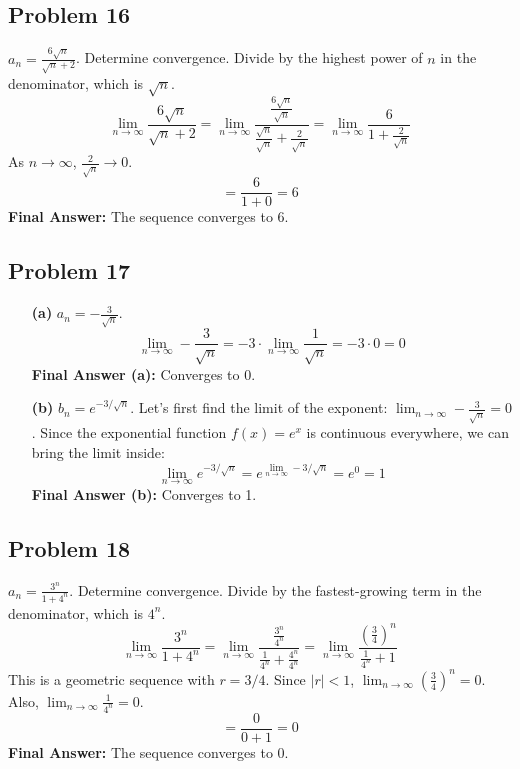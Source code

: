 \documentclass{article}
\begin{document}
\subsection{Problem 16}
$a_n = \frac{6\sqrt{n}}{\sqrt{n}+2}$. Determine convergence.
Divide by the highest power of $n$ in the denominator, which is $\sqrt{n}$.
\[ \lim_{n \to \infty} \frac{6\sqrt{n}}{\sqrt{n}+2} = \lim_{n \to \infty} \frac{\frac{6\sqrt{n}}{\sqrt{n}}}{\frac{\sqrt{n}}{\sqrt{n}}+\frac{2}{\sqrt{n}}} = \lim_{n \to \infty} \frac{6}{1+\frac{2}{\sqrt{n}}} \]
As $n \to \infty$, $\frac{2}{\sqrt{n}} \to 0$.
\[ = \frac{6}{1+0} = 6 \]
\textbf{Final Answer:} The sequence converges to 6.

\subsection{Problem 17}
\begin{itemize}
    \item[\textbf{(a)}] $a_n = -\frac{3}{\sqrt{n}}$.
    \[ \lim_{n \to \infty} -\frac{3}{\sqrt{n}} = -3 \cdot \lim_{n \to \infty} \frac{1}{\sqrt{n}} = -3 \cdot 0 = 0 \]
    \textbf{Final Answer (a):} Converges to 0.
    
    \item[\textbf{(b)}] $b_n = e^{-3/\sqrt{n}}$.
    Let's first find the limit of the exponent: $\lim_{n \to \infty} -\frac{3}{\sqrt{n}} = 0$.
    Since the exponential function $f(x)=e^x$ is continuous everywhere, we can bring the limit inside:
    \[ \lim_{n \to \infty} e^{-3/\sqrt{n}} = e^{\lim_{n \to \infty} -3/\sqrt{n}} = e^0 = 1 \]
    \textbf{Final Answer (b):} Converges to 1.
\end{itemize}

\subsection{Problem 18}
$a_n = \frac{3^n}{1+4^n}$. Determine convergence.
Divide by the fastest-growing term in the denominator, which is $4^n$.
\[ \lim_{n \to \infty} \frac{3^n}{1+4^n} = \lim_{n \to \infty} \frac{\frac{3^n}{4^n}}{\frac{1}{4^n}+\frac{4^n}{4^n}} = \lim_{n \to \infty} \frac{(\frac{3}{4})^n}{\frac{1}{4^n}+1} \]
This is a geometric sequence with $r=3/4$. Since $|r|<1$, $\lim_{n \to \infty} (\frac{3}{4})^n = 0$. Also, $\lim_{n \to \infty} \frac{1}{4^n} = 0$.
\[ = \frac{0}{0+1} = 0 \]
\textbf{Final Answer:} The sequence converges to 0.
\end{document}
